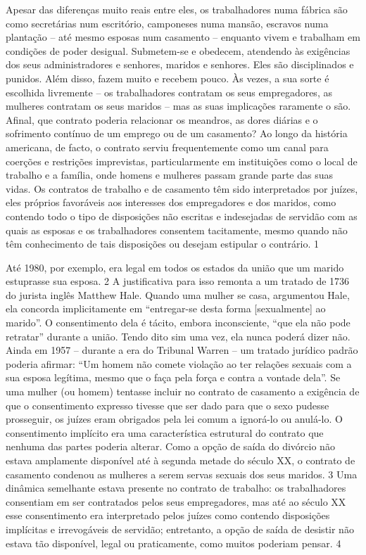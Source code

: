 \par
 
Apesar das diferenças muito reais entre eles, os trabalhadores numa fábrica são como secretárias num escritório, camponeses numa mansão, escravos numa plantação – até mesmo esposas num casamento – enquanto vivem e trabalham em condições de poder desigual. Submetem-se e obedecem, atendendo às exigências dos seus administradores e senhores, maridos e senhores. Eles são disciplinados e punidos. Além disso, fazem muito e recebem pouco. Às vezes, a sua sorte é escolhida livremente – os trabalhadores contratam os seus empregadores, as mulheres contratam os seus maridos – mas as suas implicações raramente o são. Afinal, que contrato poderia relacionar os meandros, as dores diárias e o sofrimento contínuo de um emprego ou de um casamento? Ao longo da história americana, de facto, o contrato serviu frequentemente como um canal para coerções e restrições imprevistas, particularmente em instituições como o local de trabalho e a família, onde homens e mulheres passam grande parte das suas vidas. Os contratos de trabalho e de casamento têm sido interpretados por juízes, eles próprios favoráveis ​​aos interesses dos empregadores e dos maridos, como contendo todo o tipo de disposições não escritas e indesejadas de servidão com as quais as esposas e os trabalhadores consentem tacitamente, mesmo quando não têm conhecimento de tais disposições ou desejam estipular o contrário.
 {\color{blue} 1}  

 
\par
 
Até 1980, por exemplo, era legal em todos os estados da união que um marido estuprasse sua esposa.
 {\color{blue} 2}  
A justificativa para isso remonta a um tratado de 1736 do jurista inglês Matthew Hale. Quando uma mulher se casa, argumentou Hale, ela concorda implicitamente em “entregar-se desta forma [sexualmente] ao marido”. O consentimento dela é tácito, embora inconsciente, “que ela não pode retratar” durante a união. Tendo dito sim uma vez, ela nunca poderá dizer não. Ainda em 1957 – durante a era do Tribunal Warren – um tratado jurídico padrão poderia afirmar: “Um homem não comete violação ao ter relações sexuais com a sua esposa legítima, mesmo que o faça pela força e contra a vontade dela”. Se uma mulher (ou homem) tentasse incluir no contrato de casamento a exigência de que o consentimento expresso tivesse que ser dado para que o sexo pudesse prosseguir, os juízes eram obrigados pela lei comum a ignorá-lo ou anulá-lo. O consentimento implícito era uma característica estrutural do contrato que nenhuma das partes poderia alterar. Como a opção de saída do divórcio não estava amplamente disponível até à segunda metade do século XX, o contrato de casamento condenou as mulheres a serem servas sexuais dos seus maridos.
 {\color{blue} 3}  
Uma dinâmica semelhante estava presente no contrato de trabalho: os trabalhadores consentiam em ser contratados pelos seus empregadores, mas até ao século XX esse consentimento era interpretado pelos juízes como contendo disposições implícitas e irrevogáveis ​​de servidão; entretanto, a opção de saída de desistir não estava tão disponível, legal ou praticamente, como muitos poderiam pensar.
 {\color{blue} 4}  

